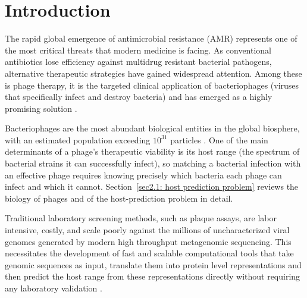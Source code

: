 \chapter{Introduction}
\label{sec1:introduction}

The rapid global emergence of antimicrobial resistance (AMR) represents one of the most critical threats that modern 
medicine is facing. As conventional antibiotics lose efficiency against multidrug resistant bacterial pathogens, alternative 
therapeutic strategies have gained widespread attention. Among these is phage therapy, it is the targeted clinical application of 
bacteriophages (viruses that specifically infect and destroy bacteria) and has emerged as a highly promising solution 
\cite{dejonge2019molecular}.

Bacteriophages are the most abundant biological entities in the global biosphere, with an estimated population exceeding 
$10^{31}$ particles \cite{dejonge2019molecular}. One of the main determinants of a phage's therapeutic viability is its host range 
(the spectrum of bacterial strains it can successfully infect), so matching a bacterial infection with an effective phage 
requires knowing precisely which bacteria each phage can infect and which it cannot. Section~\ref{sec2.1: host prediction problem} reviews the biology of phages and of the host-prediction problem in detail.


Traditional laboratory screening methods, such as plaque assays, are labor intensive, costly, and scale poorly against 
the millions of uncharacterized viral genomes generated by modern high throughput metagenomic sequencing. This necessitates 
the development of fast and scalable computational tools that take genomic sequences as input, translate them into protein 
level representations and then predict the host range from these representations directly without requiring any 
laboratory validation \cite{coclet2021global}.

